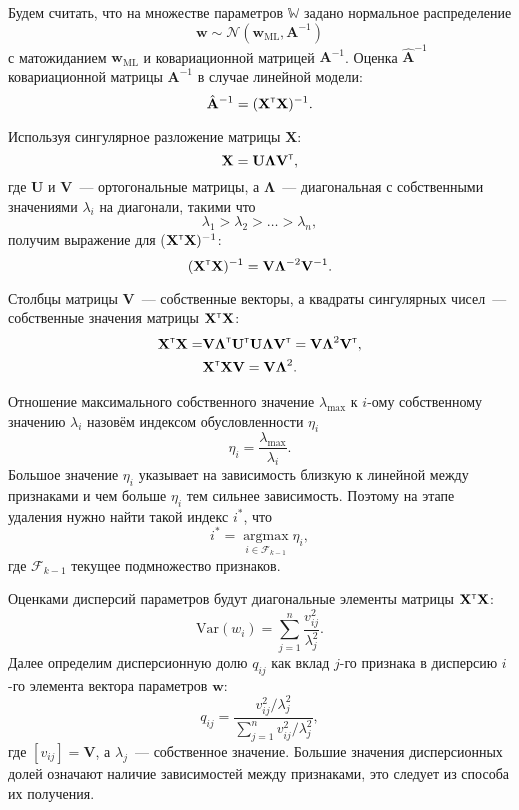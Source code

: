 \documentclass[a4paper,12pt]{article}
\newcommand{\bw}{\mathbf{w}}
\newcommand{\bX}{\mathbf{X}}
\newcommand{\bA}{\mathbf{A}}
\newcommand{\bU}{\mathbf{U}}
\newcommand{\bV}{\mathbf{V}}
\newcommand{\T}{{\text{\tiny\sffamily\upshape\mdseries T}}}
\theoremstyle{plain}
\begin{document}
Будем считать, что на множестве параметров $\mathbb{W}$ задано нормальное распределение 
\[
\bw \sim \mathcal{N}(\bw_{\mathrm{ML}}, \mathbf{A}^{-1})
\]   
с матожиданием $\bw_{\mathrm{ML}}$ и ковариационной матрицей $\mathbf{A}^{-1}$.
Оценка $\hat{\bA}^{-1}$ ковариационной матрицы $\bA^{-1}$ в случае линейной модели:
\[
\hat{\bA}^{-1} = (\bX^{\T}\bX)^{-1}.
\]

Используя сингулярное разложение матрицы $\bX$:
\[
\bX = \bU \boldsymbol{\Lambda} \bV^{\T},
\]
где $\bU$ и $\bV$~--- ортогональные матрицы, а $\boldsymbol{\Lambda}$~--- диагональная с собственными значениями $\lambda_i$ на диагонали, такими что
\[
\lambda_1 > \lambda_2 > \ldots > \lambda_n, 
\] 
получим выражение для ($\bX^{\T}\bX)^{-1}$: 
\begin{equation*}
(\bX^{\T}\bX)^{-1} = \bV\boldsymbol{\Lambda}^{-2}\bV^{-1}.
\end{equation*}
 
Столбцы матрицы $\bV$~--- собственные векторы, а квадраты сингулярных чисел~--- собственные значения матрицы $\bX^{\T}\bX$:
\begin{equation*}
\begin{split}
\bX^{\T}\bX = & \bV\boldsymbol{\Lambda}^{\T}\bU^{\T}\bU
\boldsymbol{\Lambda}\bV^{\T} = \bV\boldsymbol{\Lambda}^2\bV^{\T},\\
&\bX^{\T}\bX\bV = \bV\boldsymbol{\Lambda}^2.
\end{split}
\label{eq:sing_dec}
\end{equation*}
 
Отношение максимального собственного значение $\lambda_{\max}$ к $i$-ому собственному значению $\lambda_i$ назовём индексом обусловленности $\eta_i$
\[
\eta_i = \frac{\lambda_{\max}}{\lambda_i}.
\]
Большое значение $\eta_i$ указывает на зависимость близкую к линейной между признаками и чем больше $\eta_i$ тем сильнее зависимость.
Поэтому на этапе удаления нужно найти такой индекс $i^*$, что
\[
i^* = \mathop{\arg\max}\limits_{i \in \mathcal{F}_{k-1}} \eta_i,
\]
где $\mathcal{F}_{k-1}$ текущее подмножество признаков.

Оценками дисперсий параметров будут диагональные элементы матрицы $\bX^{\T}\bX$:
\[
\text{Var}(w_i) = \sum\limits_{j = 1} ^n \frac{v_{ij}^2} {\lambda^2_j}.
\]
Далее определим дисперсионную долю $q_{ij}$ как вклад $j$-го признака в дисперсию $i$-го элемента вектора параметров $\bw$:
\[
q_{ij} = \frac{v_{ij}^2 / \lambda^2_j}{\sum\limits_{j = 1} ^n v_{ij}^2 / \lambda^2_j},
\] 
где $[v_{ij}] = \bV$, а $\lambda_j$~--- собственное значение. 
Большие значения дисперсионных долей означают наличие зависимостей между признаками, это следует из способа их получения.
\end{document}
